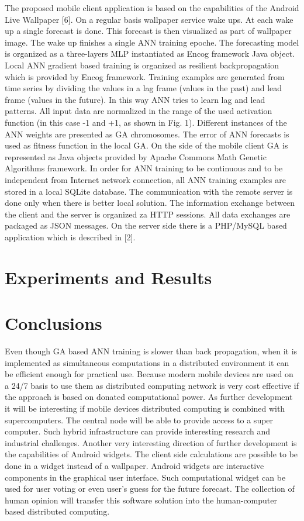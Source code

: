 \documentclass{llncs}
\begin{document}
The proposed mobile client application is based on the capabilities of the Android Live Wallpaper [6]. On a regular basis wallpaper service wake ups. At each wake up a single forecast is done. This forecast is then visualized as part of wallpaper image. The wake up finishes a single ANN training epoche. The forecasting model is organized as a three-layers MLP instantiated as Encog framework Java object. Local ANN gradient based training is organized as resilient backpropagation which is provided by Encog framework. Training examples are generated from time series by dividing the values in a lag frame (values in the past) and lead frame (values in the future). In this way ANN tries to learn lag and lead patterns. All input data are normalized in the range of the used activation function (in this case -1 and +1, as shown in Fig. 1). Different instances of the ANN weights are presented as GA chromosomes. The error of ANN forecasts is used as fitness function in the local GA. On the side of the mobile client GA is represented as Java objects provided by Apache Commons Math Genetic Algorithms framework. In order for ANN training to be continuous and to be independent from Internet network connection, all ANN training examples are stored in a local SQLite database. The communication with the remote server is done only when there is better local solution. The information exchange between the client and the server is organized za HTTP sessions. All data exchanges are packaged as JSON messages. On the server side there is a PHP/MySQL based application which is described in [2]. 
%
\section{Experiments and Results}
%
%
\section{Conclusions}
%
Even though GA based ANN training is slower than back propagation, when it is implemented as simultaneous computations in a distributed environment it can be efficient enough for practical use. Because modern mobile devices are used on a 24/7 basis to use them as distributed computing network is very cost effective if the approach is based on donated computational power. As further development it will be interesting if mobile devices distributed computing is combined with supercomputers. The central node will be able to provide access to a super computer. Such hybrid infrastructure can provide interesting research and industrial challenges. Another very interesting direction of further development is the capabilities of Android widgets. The client side calculations are possible to be done in a widget instead of a wallpaper. Android widgets are interactive components in the graphical user interface. Such computational widget can be used for user voting or even user's guess for the future forecast. The collection of human opinion will transfer this software solution into the human-computer based distributed computing. 
%
\end{document}
